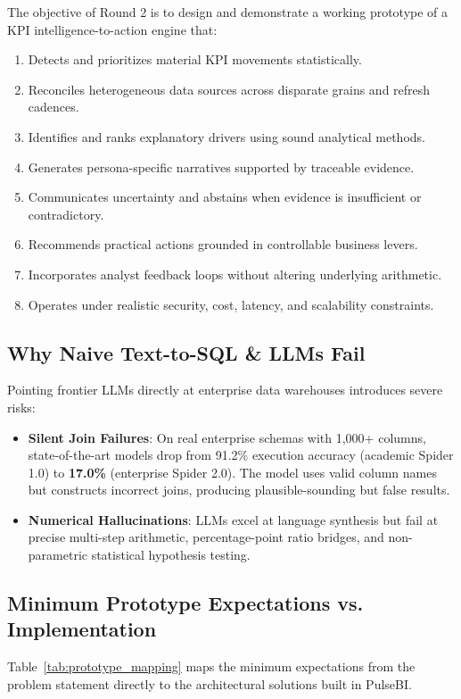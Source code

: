 \documentclass[11pt,a4paper]{article}
\begin{document}
The objective of Round 2 is to design and demonstrate a working prototype of a KPI intelligence-to-action engine that:
\begin{enumerate}[leftmargin=*]
    \item Detects and prioritizes material KPI movements statistically.
    \item Reconciles heterogeneous data sources across disparate grains and refresh cadences.
    \item Identifies and ranks explanatory drivers using sound analytical methods.
    \item Generates persona-specific narratives supported by traceable evidence.
    \item Communicates uncertainty and abstains when evidence is insufficient or contradictory.
    \item Recommends practical actions grounded in controllable business levers.
    \item Incorporates analyst feedback loops without altering underlying arithmetic.
    \item Operates under realistic security, cost, latency, and scalability constraints.
\end{enumerate}

\subsection{Why Naive Text-to-SQL & LLMs Fail}
Pointing frontier LLMs directly at enterprise data warehouses introduces severe risks:
\begin{itemize}
    \item \textbf{Silent Join Failures}: On real enterprise schemas with 1,000+ columns, state-of-the-art models drop from 91.2\% execution accuracy (academic Spider 1.0) to \textbf{17.0\%} (enterprise Spider 2.0). The model uses valid column names but constructs incorrect joins, producing plausible-sounding but false results.
    \item \textbf{Numerical Hallucinations}: LLMs excel at language synthesis but fail at precise multi-step arithmetic, percentage-point ratio bridges, and non-parametric statistical hypothesis testing.
\end{itemize}

\subsection{Minimum Prototype Expectations vs. Implementation}
Table~\ref{tab:prototype_mapping} maps the minimum expectations from the problem statement directly to the architectural solutions built in PulseBI.
\end{document}
